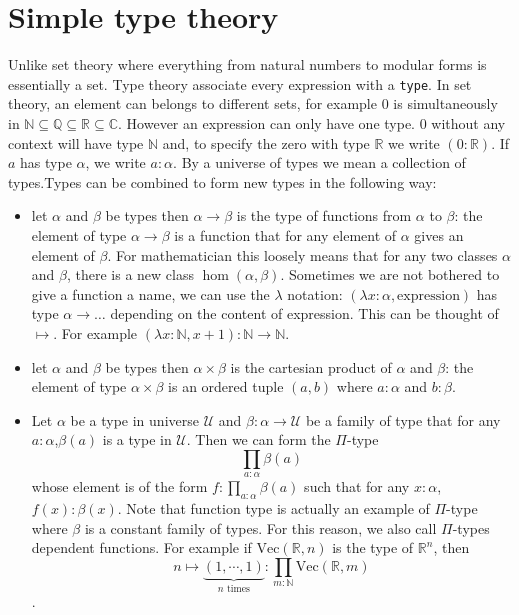 \documentclass{report}
\theoremstyle{definition}
\theoremstyle{plain}
\begin{document}
\section{Simple type theory}
Unlike set theory where everything from natural numbers to modular forms is essentially a set. Type theory associate every expression with a {\tt type}. In set theory, an element can belongs to different sets, for example $0$ is simultaneously in $\mathbb N\subseteq\mathbb Q\subseteq\mathbb R\subseteq\mathbb C$. However an expression can only have one type. $0$ without any context will have type $\mathbb N$ and, to specify the zero with type $\mathbb R$ we write $(0:\mathbb R)$. If $a$ has type $\alpha$, we write $a:\alpha$. By a universe of types we mean a collection of types.Types can be combined to form new types in the following way:
\begin{itemize}
  \item let $\alpha$ and $\beta$ be types then $\alpha\to\beta$ is the type of functions from $\alpha$ to $\beta$: the element of type $\alpha\to\beta$ is a function that for any element of $\alpha$ gives an element of $\beta$. For mathematician this loosely means that for any two classes $\alpha$ and $\beta$, there is a new class $\hom(\alpha,\beta)$. Sometimes we are not bothered to give a function a name, we can use the $\lambda$ notation: $(\lambda x:\alpha, \text{expression})$ has type $\alpha\to\dots$ depending on the content of expression. This can be thought of $\mapsto$. For example $(\lambda x:\mathbb N, x+1):\mathbb{N}\to\mathbb{N}$.
  \item let $\alpha$ and $\beta$ be types then $\alpha\times\beta$ is the cartesian product of $\alpha$ and $\beta$: the element of type $\alpha\times\beta$ is an ordered tuple $(a,b)$ where $a:\alpha$ and $b:\beta$.
  \item Let $\alpha$ be a type in universe $\mathcal U$ and $\beta:\alpha\to\mathcal U$ be a family of type that for any $a:\alpha$,$\beta(a)$ is a type in $\mathcal U$. Then we can form the $\Pi$-type $$\prod_{a:\alpha}\beta(a)$$ whose element is of the form $f:\prod_{a:\alpha}\beta(a)$ such that for any $x:\alpha$, $f(x):\beta(x)$. Note that function type is actually an example of $\Pi$-type where $\beta$ is a constant family of types. For this reason, we also call $\Pi$-types dependent functions. For example if $\mathrm{Vec}(\mathbb{R},n)$ is the type of $\mathbb R^n$, then 
    $$n\mapsto\underbrace{(1,\cdots,1)}_{n\text{ times}}:\prod_{m:\mathbb N} \mathrm{Vec}(\mathbb R, m)$$.
\end{itemize}
\end{document}
